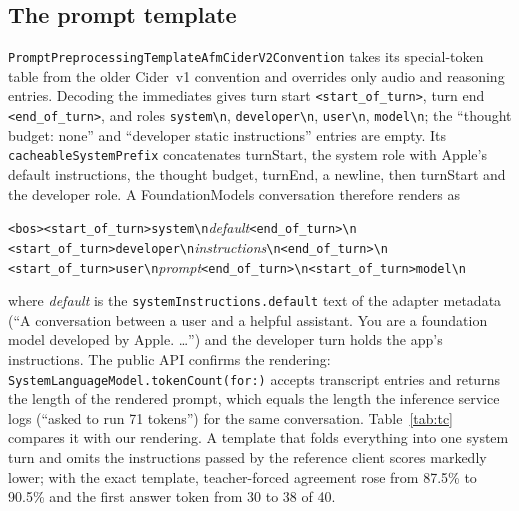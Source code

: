 \documentclass[11pt,reqno]{amsart}
\newcommand{\code}[1]{\texttt{#1}}
\theoremstyle{definition}
\begin{document}
\subsection{The prompt template}
\code{PromptPreprocessingTemplateAfmCiderV2Convention} takes its special-token table from the older Cider~v1 convention and overrides only audio and reasoning entries. Decoding the immediates gives turn start \code{<start\_of\_turn>}, turn end \code{<end\_of\_turn>}, and roles \code{system\textbackslash n}, \code{developer\textbackslash n}, \code{user\textbackslash n}, \code{model\textbackslash n}; the ``thought budget: none'' and ``developer static instructions'' entries are empty. Its \code{cacheableSystemPrefix} concatenates
turnStart, the system role with Apple's default instructions, the thought budget, turnEnd, a newline, then turnStart and the developer role. A FoundationModels conversation therefore renders as
\begin{center}\small
\code{<bos><start\_of\_turn>system\textbackslash n}\emph{default}\code{<end\_of\_turn>\textbackslash n}\\
\code{<start\_of\_turn>developer\textbackslash n}\emph{instructions}\code{\textbackslash n<end\_of\_turn>\textbackslash n}\\
\code{<start\_of\_turn>user\textbackslash n}\emph{prompt}\code{<end\_of\_turn>\textbackslash n<start\_of\_turn>model\textbackslash n}
\end{center}
where \emph{default} is the \code{systemInstructions.default} text of the adapter metadata (``A conversation between a user and a helpful assistant. You are a foundation model developed by Apple. \ldots'') and the developer turn holds the app's instructions. The public API confirms the rendering: \code{SystemLanguageModel.tokenCount(for:)} accepts transcript entries and returns the length of the rendered prompt, which equals the length the inference service logs (``asked to run 71 tokens'') for the same conversation. Table~\ref{tab:tc} compares it with our rendering. A template that folds everything into one system turn and omits the instructions passed by the reference client scores markedly lower; with the exact template, teacher-forced agreement rose from 87.5\% to 90.5\% and the first answer token from 30 to 38 of 40.
\end{document}
